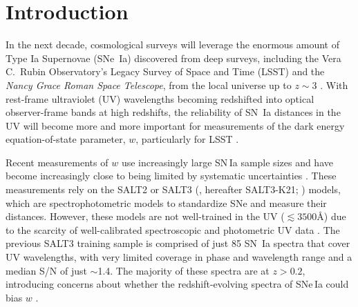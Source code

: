 \documentclass[twocolumn,tighten,times,floatfix]{aastex631}
\begin{document}

\section{Introduction} \label{sec:intro}


In the next decade, cosmological surveys will leverage the enormous amount of Type Ia Supernovae (SNe~Ia) discovered from deep surveys, including the Vera C.\ Rubin Observatory's Legacy Survey of Space and Time (LSST) and the \textit{Nancy Grace Roman Space Telescope}, from the local universe up to $z\sim 3$ \citep{Rose21, Mitra23, Kessler25, Rubin25}. With rest-frame ultraviolet (UV) wavelengths becoming redshifted into optical observer-frame bands at high redshifts, the reliability of SN~Ia distances in the UV will become more and more important for measurements of the dark energy equation-of-state parameter, $w$, particularly for LSST \citep{lsst19}.

Recent measurements of $w$ use increasingly large SN\,Ia sample sizes and have become increasingly close to being limited by systematic uncertainties \citep{Scolnic18,Jones19,Brout22,Abbott24,Vincenzi24}. These measurements rely on the SALT2 \citep{Guy07,Guy10,Betoule14,Taylor21} or SALT3 (\citealt{kenworthy_salt3_2021}, hereafter SALT3-K21; \citealt{Pierel_salt3nir_2022,Taylor23}) models, which are spectrophotometric models to standardize SNe and measure their distances.  However, these models are not well-trained in the UV ($\lesssim 3500$\AA) due to the scarcity of well-calibrated spectroscopic and photometric UV data \citep{Taylor23}. The previous SALT3 training sample is comprised of just 85 SN~Ia spectra that cover UV wavelengths, with very limited coverage in phase and wavelength range and a median S/N of just $\sim$1.4.
The majority of these spectra are at $z>0.2$, introducing concerns about whether the redshift-evolving spectra of SNe\,Ia could bias $w$ \citep{milne13, foley13, foley16, Milne2015, Pan20, Nicolas21, Thorp24, Popovic25b}. 
\end{document}
